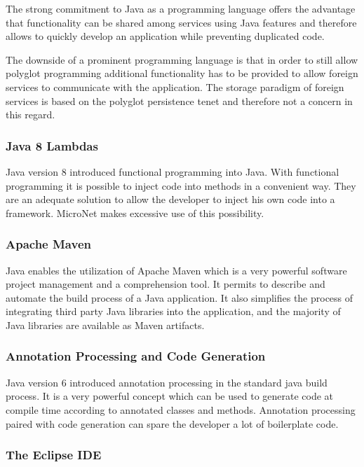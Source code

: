 The strong commitment to Java as a programming language offers the
advantage that functionality can be shared among services using Java features
and therefore allows to quickly develop an application while preventing
duplicated code.

The downside of a prominent programming language is that in order to still allow
polyglot programming additional functionality has to be provided to allow
foreign services to communicate with the application. The storage paradigm of
foreign services is based on the polyglot persistence tenet and therefore not a
concern in this regard.

\subsubsection{Java 8 Lambdas}

Java version 8 introduced functional programming into Java. With
functional programming it is possible to inject code into methods in a
convenient way. They are an adequate solution to allow the developer to inject
his own code into a framework. MicroNet makes excessive use of this possibility.

\subsubsection{Apache Maven}

Java enables the utilization of Apache Maven which is a very powerful software
project management and a comprehension tool. It permits to describe and automate
the build process of a Java application. It also simplifies the process of
integrating third party Java libraries into the application, and the majority of
Java libraries are available as Maven artifacts.

\subsubsection{Annotation Processing and Code Generation}

Java version 6 introduced annotation processing in the standard java build
process. It is a very powerful concept which can be used to generate code at
compile time according to annotated classes and methods. Annotation processing
paired with code generation can spare the developer a lot of boilerplate code.

\subsubsection{The Eclipse IDE}

